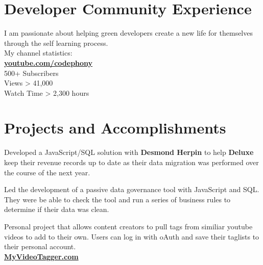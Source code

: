 \documentclass[]{deedy-resume-openfont}
\begin{document}
\begin{minipage}[t]{0.66\textwidth}
\section{\bf Developer Community Experience}
I am passionate about helping green developers create a new life for themselves through the self learning process.  \\
My channel statistics: \\
\textbullet{} \href{https://youtube.com/codephony}{\bf youtube.com/codephony}\\
\textbullet{} 500+ Subscribers\\
\textbullet{} Views > 41,000 \\
\textbullet{} Watch Time > 2,300 hours \\

\section{Projects and Accomplishments}
Developed a JavaScript/SQL solution with \textbf{Desmond Herpin} to help \textbf{Deluxe} keep their revenue records up to date as their data migration was performed over the course of the next year.
\sectionsep

Led the development of a passive data governance tool with JavaScript and SQL.  They were be able to check the tool and run a series of business rules to determine if their data was clean.
\sectionsep

Personal project that allows content creators to pull tags from similiar youtube videos to add to their own.  Users can log in with  oAuth and save their taglists to their personal account. \\
\href{https://myvideotagger.com}{\bf MyVideoTagger.com}
\sectionsep


\end{minipage} 
\end{document}
